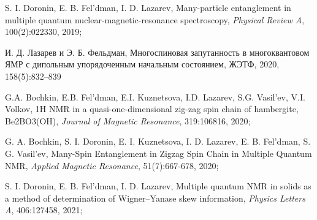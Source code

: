 \item 
S. I. Doronin, E. B. Fel'dman,  I. D. Lazarev, Many-particle entanglement in multiple quantum nuclear-magnetic-resonance spectroscopy, \textit{Physical Review A}, 100(2):022330, 2019;


\item И. Д. Лазарев и Э. Б. Фельдман, 
Многоспиновая запутанность в многоквантовом ЯМР с дипольным упорядоченным начальным состоянием,  
ЖЭТФ, 2020, 158(5):832–839

\item 
G.A. Bochkin, E.B. Fel'dman, E.I. Kuznetsova, I.D. Lazarev, S.G. Vasil'ev, V.I. Volkov, 1H NMR in a quasi-one-dimensional zig-zag spin chain of hambergite, Be2BO3(OH), \textit{Journal of Magnetic Resonance}, 319:106816, 2020;

\item 
G. A. Bochkin, S. I. Doronin, E. I. Kuznetsova, I. D. Lazarev, E. B. Fel'dman, S. G. Vasil'ev, Many-Spin Entanglement in Zigzag Spin Chain in Multiple Quantum NMR, \textit{Applied Magnetic Resonance}, 51(7):667-678, 2020;

\item 
S. I. Doronin, E. B. Fel'dman,  I. D. Lazarev, Multiple quantum NMR in solids as a method of determination of Wigner–Yanase skew information, \textit{Physics Letters A}, 406:127458, 2021;